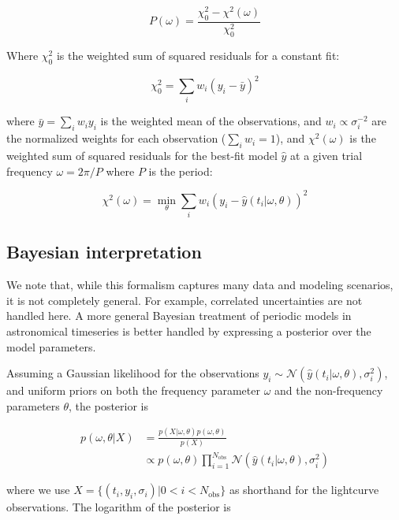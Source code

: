 \documentclass[apj]{emulateapj}
\begin{document}
\begin{equation}
\label{eq:lsp}
P(\omega) = \frac{\chi^2_0 - \chi^2(\omega)}{\chi^2_0}
\end{equation}

Where $\chi^2_0$ is the weighted sum of squared residuals for a constant fit:

\begin{equation}
\chi^2_0 = \sum_i w_i (y_i - \bar{y})^2
\end{equation}

where $\bar{y} = \sum_i w_i y_i$ is the weighted mean of the observations, and
$w_i \propto \sigma_i^{-2}$ are the normalized weights for each observation ($\sum_i w_i = 1$),
and $\chi^2(\omega)$ is the weighted sum of squared residuals for the best-fit model $\hat{y}$ at
a given trial frequency $\omega = 2\pi / P$ where $P$ is the period:

\begin{equation}
\chi^2(\omega) = \min_{\theta} \sum_i w_i (y_i - \hat{y}(t_i| \omega, \theta))^2
\end{equation}



\subsection{Bayesian interpretation}

We note that, while this formalism captures many data and modeling scenarios, it is not completely general. For example, correlated
uncertainties are not handled here. A more general Bayesian treatment of periodic models in astronomical timeseries
is better handled by expressing a posterior over the model parameters.

Assuming a Gaussian likelihood for the observations $y_i \sim \mathcal{N}(\hat{y}( t_i | \omega, \theta), \sigma^2_i)$, and uniform
priors on both the frequency parameter $\omega$ and the non-frequency parameters $\theta$, the posterior is

\begin{align}
    p(\omega, \theta|X) &= \frac{p(X|\omega, \theta)p(\omega, \theta)}{p(X)}\\
                        &\propto p(\omega, \theta) \prod_{i=1}^{N_{\mathrm{obs}}}\mathcal{N}(\hat{y}(t_i | \omega, \theta), \sigma^2_i)
\end{align}

where we use $X = \{(t_i, y_i, \sigma_i) | 0 < i < N_{\mathrm{obs}}\}$ as shorthand for the lightcurve observations. The logarithm of the posterior is
\end{document}
